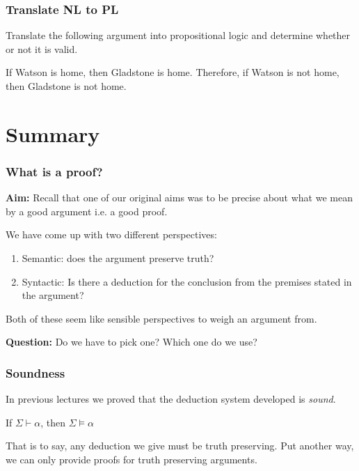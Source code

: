\documentclass{beamer}
\begin{document}
\begin{frame}
	\frametitle{Translate NL to PL}
	
	Translate the following argument into propositional logic and determine whether or not it is valid. 
	
	\vspace{0.5cm}
	
	If Watson is home, then Gladstone is home. Therefore, if Watson is not home, then Gladstone is not home.  
	
	\vspace{6cm}
	
\end{frame}

\section{Summary}

\begin{frame}
  \frametitle{What is a proof?}

	{\bf Aim:} Recall that one of our original aims was to be precise about what we mean by a good argument i.e. a good proof. 
	
	\vspace{0.5cm} 
	
	We have come up with two different perspectives: 
	
	\begin{enumerate}
		\item Semantic: does the argument preserve truth? 
		\item Syntactic: Is there a deduction for the conclusion from the premises stated in the argument? 
	\end{enumerate}

	Both of these seem like sensible perspectives to weigh an argument from. 
	
	\vspace{0.5cm} 
	
	{\bf Question:} Do we have to pick one? Which one do we use?
\end{frame}

\begin{frame}
	\frametitle{Soundness}
	
	In previous lectures we proved that the deduction system developed is \emph{sound}. 
	
	\vspace{0.5cm}
	
	 If $\Sigma \vdash \alpha $, then $\Sigma \vDash \alpha $
	
	\vspace{0.5cm}
	
	That is to say, any deduction we give must be truth preserving. Put another way, we can only provide proofs for truth preserving arguments. 
	
\end{frame}
\end{document}

